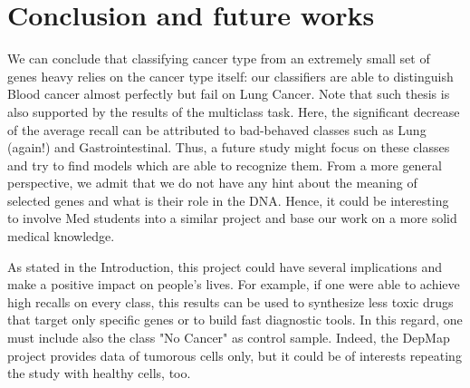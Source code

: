 \documentclass[a4paper,11pt, oneside]{article}  %
\begin{document}
\section{Conclusion and future works}
We can conclude that classifying cancer type from an extremely small set of genes heavy relies on the cancer type itself: our classifiers are able to distinguish Blood cancer almost perfectly but fail on Lung Cancer.  Note that such thesis is also supported by the results of the multiclass task. Here, the significant decrease of the average recall can be attributed to bad-behaved classes such as Lung (again!) and Gastrointestinal. Thus, a future study might focus on these classes and try to find models which are able to recognize them.  From a more general perspective,  we admit that we do not have any hint about the meaning of selected genes and what is their role in the DNA.  Hence, it could be interesting to involve Med students into a similar project and base our work on a more solid medical knowledge.   

As stated in the Introduction, this project could have several implications and make a positive impact on people's lives. For example, if one were able to achieve high recalls on every class, this results can be used to synthesize less toxic drugs that target only specific genes or to build fast diagnostic tools. In this regard, one must include also the class "No Cancer" as control sample. Indeed, the DepMap project provides data of tumorous cells only, but it could be of interests repeating the study with healthy cells, too.  
\end{document}
